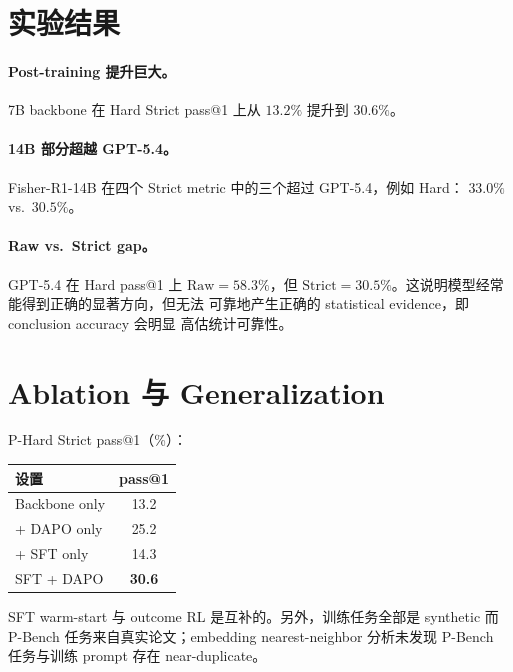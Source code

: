 \documentclass[12pt]{ctexart}
\begin{document}
\section{实验结果}

\paragraph{Post-training 提升巨大。}
7B backbone 在 Hard Strict pass@1 上从 $13.2\%$ 提升到 $30.6\%$。

\paragraph{14B 部分超越 GPT-5.4。}
Fisher-R1-14B 在四个 Strict metric 中的三个超过 GPT-5.4，例如 Hard：
$33.0\%$ vs.\ $30.5\%$。

\paragraph{Raw vs.\ Strict gap。}
GPT-5.4 在 Hard pass@1 上 $\text{Raw} = 58.3\%$，但
$\text{Strict} = 30.5\%$。这说明模型经常能得到正确的显著方向，但无法
可靠地产生正确的 statistical evidence，即 conclusion accuracy 会明显
高估统计可靠性。

\section{Ablation 与 Generalization}

P-Hard Strict pass@1（\%）：

\begin{center}
\begin{tabular}{l c}
  \toprule
  设置 & pass@1 \\
  \midrule
  Backbone only          & 13.2 \\
  + DAPO only            & 25.2 \\
  + SFT only             & 14.3 \\
  SFT + DAPO             & \textbf{30.6} \\
  \bottomrule
\end{tabular}
\end{center}

SFT warm-start 与 outcome RL 是互补的。另外，训练任务全部是 synthetic
而 P-Bench 任务来自真实论文；embedding nearest-neighbor 分析未发现
P-Bench 任务与训练 prompt 存在 near-duplicate。
\end{document}
